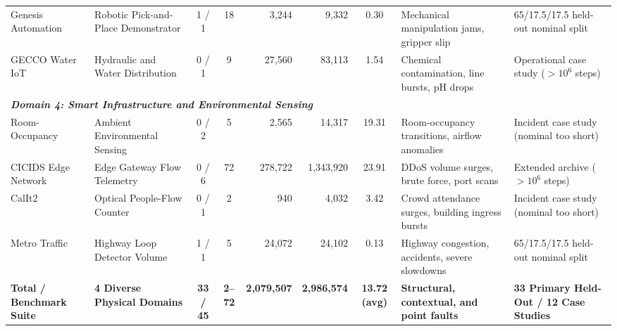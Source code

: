 \begin{table}[t]
\begin{tabular}{@{}ll c c r r c l l@{}}
Genesis Automation               & Robotic Pick-and-Place Demonstrator& 1 / 1   & 18 & 3,244     & 9,332     & 0.30  & Mechanical manipulation jams, gripper slip        & 65/17.5/17.5 held-out nominal split \\
GECCO Water IoT                  & Hydraulic and Water Distribution   & 0 / 1   & 9  & 27,560    & 83,113    & 1.54  & Chemical contamination, line bursts, pH drops     & Operational case study ($>10^6$ steps) \\
\midrule
\multicolumn{9}{l}{\textit{\textbf{Domain 4: Smart Infrastructure and Environmental Sensing}}} \\
Room-Occupancy \cite{candanedo2016accurate}& Ambient Environmental Sensing & 0 / 2   & 5  & 2,565     & 14,317    & 19.31 & Room-occupancy transitions, airflow anomalies     & Incident case study (nominal too short) \\
CICIDS Edge Network              & Edge Gateway Flow Telemetry        & 0 / 6   & 72 & 278,722   & 1,343,920 & 23.91 & DDoS volume surges, brute force, port scans       & Extended archive ($>10^6$ steps) \\
CalIt2 \cite{asuncion2007uci}    & Optical People-Flow Counter        & 0 / 1   & 2  & 940       & 4,032     & 3.42  & Crowd attendance surges, building ingress bursts  & Incident case study (nominal too short) \\
Metro Traffic                    & Highway Loop Detector Volume       & 1 / 1   & 5  & 24,072    & 24,102    & 0.13  & Highway congestion, accidents, severe slowdowns   & 65/17.5/17.5 held-out nominal split \\
\midrule
\textbf{Total / Benchmark Suite} & \textbf{4 Diverse Physical Domains} & \textbf{33 / 45} & \textbf{2--72} & \textbf{2,079,507} & \textbf{2,986,574} & \textbf{13.72 (avg)} & \textbf{Structural, contextual, and point faults} & \textbf{33 Primary Held-Out / 12 Case Studies} \\
\bottomrule
\end{tabular}
\end{table}


